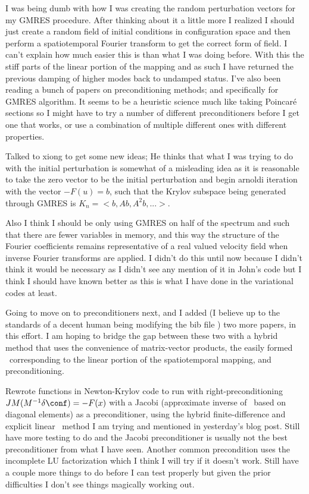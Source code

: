 I was being dumb with how I was creating the random perturbation vectors for my
GMRES procedure. After thinking about it a little more I realized I should just
create a random field of initial conditions in configuration space and then perform
a spatiotemporal Fourier transform to get the correct form of field. I can't explain
how much easier this is than what I was doing before. With this the stiff parts of the
linear portion of the mapping and as such I have returned the previous damping
of higher modes back to undamped status.
I've also been reading a bunch of
papers on
preconditioning methods; and specifically for GMRES algorithm. It seems to be
a heuristic science much like taking Poincar\'e sections so I might have to
try a number of different preconditioners before I get one that works, or use
a combination of multiple different ones with different properties.

Talked to xiong to get some new ideas; He thinks that what I was trying to do
with the initial perturbation is somewhat of a misleading idea as it is reasonable
to take the zero vector to be the initial perturbation and begin arnoldi iteration
with the vector $-F(u) = b$, such that the Krylov subspace being generated through
GMRES is $K_n = <b, Ab, A^2b, ...>$.

Also I think I should be only using GMRES on half of the spectrum and such that there
are fewer variables in memory, and this way the structure of the Fourier coefficients
remains representative of a real valued velocity field when inverse Fourier transforms
are applied. I didn't do this until now because I didn't think it would be necessary
as I didn't see any mention of it in John's code but I think I should have known better
as this is what I have done in the variational codes at least.

Going to move on to preconditioners next, and I added (I believe up to the standards
of a decent human being modifying the bib file ) two more papers,  in this effort.
I am hoping to bridge the gap between these two with a hybrid method that uses the convenience of matrix-vector
products, the easily formed \jacobianM\ corresponding to the linear portion of the spatiotemporal mapping, and
preconditioning.

Rewrote functions in Newton-Krylov code to run with right-preconditioning
$J M (M^{-1} \delta \conf) = -F(x)$ with a Jacobi (approximate inverse of
\jacobianM\ based on diagonal elements) as a preconditioner, using the
hybrid finite-difference and explicit linear \jacobianM\ method I am trying and mentioned
in yesterday's blog post. Still have more
testing to do and the Jacobi preconditioner is usually not the best preconditioner from what
I have seen. Another common precondition uses the incomplete LU factorization
which I think I will try if it doesn't work.
Still have a couple more things to do before I can test properly but given
the prior difficulties I don't see things magically working out.

